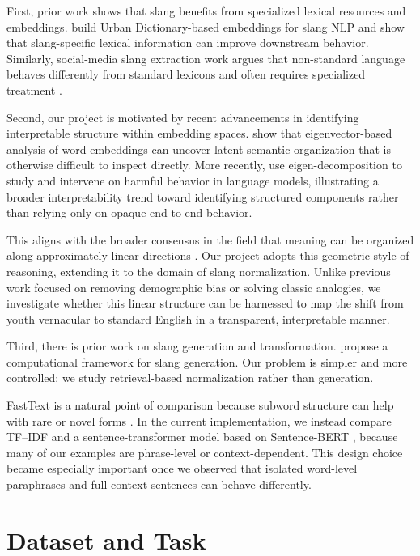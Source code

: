 \documentclass{article}
\begin{document}
First, prior work shows that slang benefits from specialized lexical resources and embeddings.
\citet{wilson2020urban} build Urban Dictionary-based embeddings for slang NLP and show that slang-specific lexical information can improve downstream behavior.
Similarly, social-media slang extraction work argues that non-standard language behaves differently from standard lexicons and often requires specialized treatment \citep{matsumoto2019slang}.

Second, our project is motivated by recent advancements in identifying interpretable structure within embedding spaces. \citet{shin2018eigenvectors} show that eigenvector-based analysis of word embeddings can uncover latent semantic organization that is otherwise difficult to inspect directly. More recently, \citet{shaik2026redefining} use eigen-decomposition to study and intervene on harmful behavior in language models, illustrating a broader interpretability trend toward identifying structured components rather than relying only on opaque end-to-end behavior.

This aligns with the broader consensus in the field that meaning can be organized along approximately linear directions \citep{bojanowski2017enriching, bolukbasi2016man}.
Our project adopts this geometric style of reasoning, extending it to the domain of slang normalization. Unlike previous work focused on removing demographic bias or solving classic analogies, we investigate whether this linear structure can be harnessed to map the shift from youth vernacular to standard English in a transparent, interpretable manner.

Third, there is prior work on slang generation and transformation.
\citet{sun2021computational} propose a computational framework for slang generation.
Our problem is simpler and more controlled: we study retrieval-based normalization rather than generation.

FastText is a natural point of comparison because subword structure can help with rare or novel forms \citep{bojanowski2017enriching}.
In the current implementation, we instead compare TF--IDF and a sentence-transformer model based on Sentence-BERT \citep{reimers2019sentence}, because many of our examples are phrase-level or context-dependent.
This design choice became especially important once we observed that isolated word-level paraphrases and full context sentences can behave differently.

\section{Dataset and Task}
\end{document}
